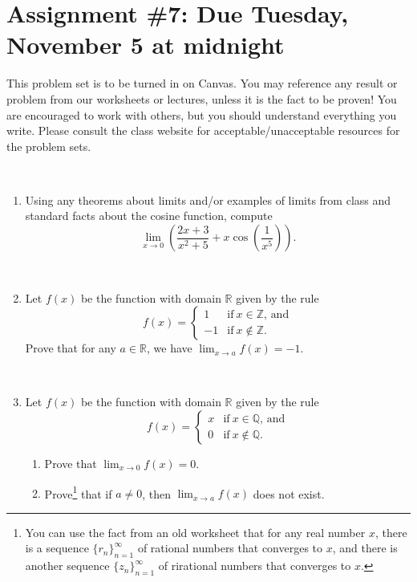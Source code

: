 \documentclass[12pt]{amsart}
\newcommand{\Q}{\mathbb{Q}}
\newcommand{\Z}{\mathbb{Z}}
\newcommand{\R}{\mathbb{R}}
\newcommand{\ds}{\displaystyle}
\newcommand{\showsol}[1]{\def\displaysol{#1}}
\begin{document}
\showsol{1}
	
	\thispagestyle{empty}
	
	\section*{Assignment \#7: Due Tuesday, November 5 at midnight}
	
	This problem set is to be turned in on Canvas. You may reference any result or problem from our worksheets or lectures, unless it is the fact to be proven! You are encouraged to work with others, but you should understand everything you write. Please consult the class website for acceptable/unacceptable resources for the problem sets.
	
	\
	
	

\begin{enumerate}
\item Using any theorems about limits and/or examples of limits from class and standard facts about the cosine function, compute 
\[ \lim_{x\to 0} \left( \frac{2x+3}{x^2+5} + x \cos\left(\frac{1}{x^5}\right)\right). \]

\

	\item Let $f(x)$ be the function with domain $\R$ given by the rule
	\[ f(x) = \begin{cases} 1 &\textrm{if} \ x\in \Z, \, \textrm{and} \\ 
		-1 &\text{if} \ x\notin \Z.\end{cases}\]
		Prove that for any $a\in \R$, we have $\ds\lim_{x \to a} f(x)=-1$.

\

			\item Let $f(x)$ be the function with domain $\R$ given by the rule
	\[ f(x) = \begin{cases} x &\text{if} \ x\in \Q, \, \textrm{and} \\ 
		0 &\text{if} \ x\notin \Q.\end{cases}\]
		\begin{enumerate}
		\item Prove that $\ds\lim_{x \to 0} f(x)=0$.
		\item Prove\footnote{You can use the fact from an old worksheet that for any real number $x$, there is a sequence $\{r_n\}_{n=1}^\infty$ of rational numbers that converges to $x$, and there is another sequence $\{z_n\}_{n=1}^\infty$ of rirational numbers that converges to $x$.} that if $a\neq 0$, then $\ds\lim_{x\to a} f(x)$ does not exist.
	\end{enumerate}		


\end{enumerate}
\end{document}
